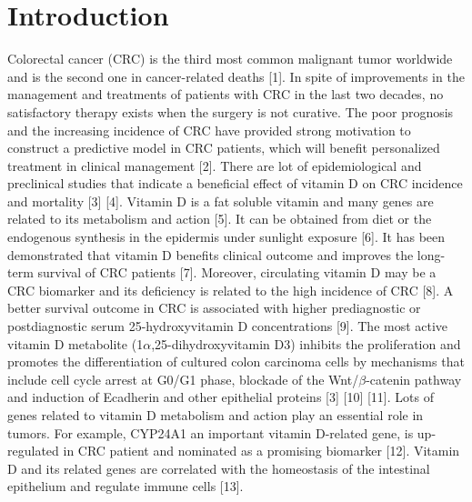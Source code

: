 \documentclass[fleqn,10pt]{SelfArx} %
\affiliation{\textsuperscript{1}\textit{diego.barqueromorera@studenti.unitn.it}} %
\affiliation{\textsuperscript{2}\textit{giacomo.fantoni@studenti.unitn.it}} %
\affiliation{\textsuperscript{3}\textit{gaia.faggin@studenti.unitn.it}} %
\affiliation{\textsuperscript{4}\textit{leonardo.golinelli@studenti.unitn.it}} %
\begin{document}
\maketitle %

\tableofcontents %

\thispagestyle{empty} %


\section{Introduction}
Colorectal cancer (CRC) is the third most common malignant tumor worldwide and is the second one in cancer-related deaths [1]. In spite of improvements in the management and treatments of patients with CRC in the last two decades, no satisfactory therapy exists when the surgery is not curative. The poor prognosis and the increasing incidence of CRC have provided strong motivation to construct a predictive model in CRC patients, which will benefit personalized treatment in clinical management [2]. There are lot of epidemiological and preclinical studies that indicate a beneficial effect of vitamin D on CRC incidence and mortality [3] [4]. Vitamin D is a fat soluble vitamin and many genes are related to its metabolism and action [5]. It can be obtained from diet or the endogenous synthesis in the epidermis under sunlight exposure [6]. It has been demonstrated that vitamin D benefits clinical outcome and improves the long-term survival of CRC patients [7]. Moreover, circulating vitamin D may be a CRC biomarker and its deficiency is related to the high incidence of CRC [8]. A better survival outcome in CRC is associated with higher prediagnostic or postdiagnostic serum 25-hydroxyvitamin D concentrations [9]. The most active vitamin D metabolite (1$\alpha$,25-dihydroxyvitamin D3) inhibits the proliferation and promotes the differentiation of cultured colon carcinoma cells by mechanisms that include cell cycle arrest at G0/G1 phase, blockade of the Wnt/$\beta$-catenin pathway and induction of Ecadherin and other epithelial proteins [3] [10] [11]. Lots of genes related to vitamin D metabolism and action play an essential role in tumors. For example, CYP24A1 an important vitamin D-related gene, is up-regulated in CRC patient and nominated as a promising biomarker [12]. Vitamin D and its related genes are correlated with the homeostasis of the intestinal epithelium and regulate immune cells [13].
\end{document}
